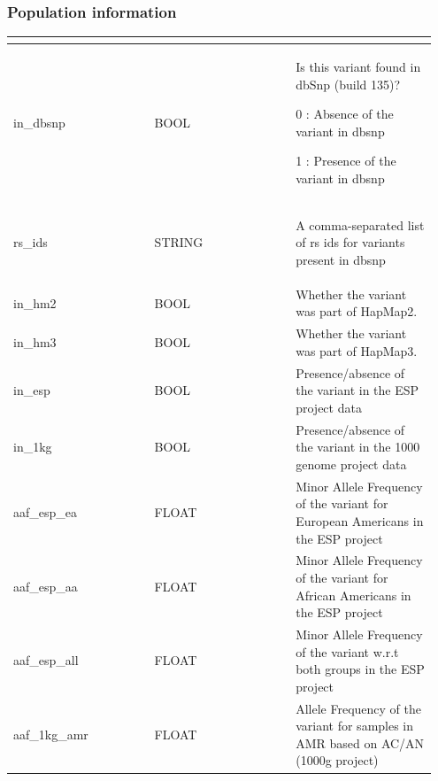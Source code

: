\documentclass[letterpaper,10pt,english]{sphinxmanual}
\begin{document}
\subsubsection{Population information}
\label{content/database_schema:population-information}
\begin{tabular}{|p{0.317\linewidth}|p{0.317\linewidth}|p{0.317\linewidth}|}
\hline
\textbf{} & \textbf{} & \textbf{}\\\hline

in\_dbsnp
 & 
BOOL
 & 
\begin{DUlineblock}{0em}
\item[] Is this variant found in dbSnp (build 135)?
\item[] 0 : Absence of the variant in dbsnp
\item[] 1 : Presence of the variant in dbsnp
\end{DUlineblock}
\\\hline

rs\_ids
 & 
STRING
 & 
\begin{DUlineblock}{0em}
\item[] A comma-separated list of rs ids for variants present in dbsnp
\end{DUlineblock}
\\\hline

in\_hm2
 & 
BOOL
 & 
Whether the variant was part of HapMap2.
\\\hline

in\_hm3
 & 
BOOL
 & 
Whether the variant was part of HapMap3.
\\\hline

in\_esp
 & 
BOOL
 & 
Presence/absence of the variant in the ESP project data
\\\hline

in\_1kg
 & 
BOOL
 & 
Presence/absence of the variant in the 1000 genome project data
\\\hline

aaf\_esp\_ea
 & 
FLOAT
 & 
Minor Allele Frequency of the variant for European Americans in the ESP project
\\\hline

aaf\_esp\_aa
 & 
FLOAT
 & 
Minor Allele Frequency of the variant for African Americans in the ESP project
\\\hline

aaf\_esp\_all
 & 
FLOAT
 & 
Minor Allele Frequency of the variant w.r.t both groups in the ESP project
\\\hline

aaf\_1kg\_amr
 & 
FLOAT
 & 
Allele Frequency of the variant for samples in AMR based on AC/AN (1000g project)
\\\hline


\end{tabular}
\end{document}
